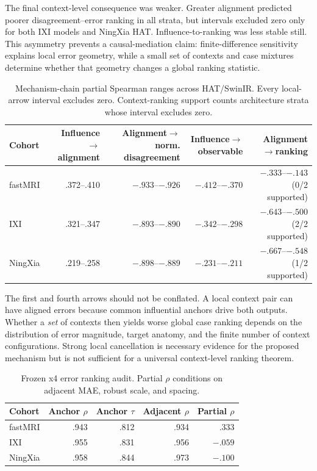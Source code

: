 \documentclass[10pt,twocolumn,letterpaper]{article}
\begin{document}
The final context-level consequence was weaker. Greater alignment predicted poorer disagreement--error ranking in all strata, but intervals excluded zero only for both IXI models and NingXia HAT. Influence-to-ranking was less stable still. This asymmetry prevents a causal-mediation claim: finite-difference sensitivity explains local error geometry, while a small set of contexts and case mixtures determine whether that geometry changes a global ranking statistic.

\begin{table}[t]
\centering
\caption{Mechanism-chain partial Spearman ranges across HAT/SwinIR. Every local-arrow interval excludes zero. Context-ranking support counts architecture strata whose interval excludes zero.}
\label{tab:chain}
\scriptsize
\setlength{\tabcolsep}{3.2pt}
\begin{tabular}{lrrrr}
\toprule
Cohort&Influence$\rightarrow$alignment&Alignment$\rightarrow$norm. disagreement&Influence$\rightarrow$observable&Alignment$\rightarrow$ranking\\
\midrule
fastMRI&.372--.410&$-.933$--$-.926$&$-.412$--$-.370$&$-.333$--$-.143$ (0/2 supported)\\
IXI&.321--.347&$-.893$--$-.890$&$-.342$--$-.298$&$-.643$--$-.500$ (2/2 supported)\\
NingXia&.219--.258&$-.898$--$-.889$&$-.231$--$-.211$&$-.667$--$-.548$ (1/2 supported)\\
\bottomrule
\end{tabular}
\end{table}

The first and fourth arrows should not be conflated. A local context pair can have aligned errors because common influential anchors drive both outputs. Whether a \emph{set} of contexts then yields worse global case ranking depends on the distribution of error magnitude, target anatomy, and the finite number of context configurations. Strong local cancellation is necessary evidence for the proposed mechanism but is not sufficient for a universal context-level ranking theorem.

\begin{table}[t]
\centering
\caption{Frozen x4 error ranking audit. Partial $\rho$ conditions on adjacent MAE, robust scale, and spacing.}
\label{tab:anchorcv}
\setlength{\tabcolsep}{4pt}
\begin{tabular}{lrrrr}
\toprule
Cohort&Anchor $\rho$&Anchor $\tau$&Adjacent $\rho$&Partial $\rho$\\
\midrule
fastMRI&.943&.812&.934&.333\\
IXI&.955&.831&.956&$-.059$\\
NingXia&.958&.844&.973&$-.100$\\
\bottomrule
\end{tabular}
\end{table}
\end{document}
